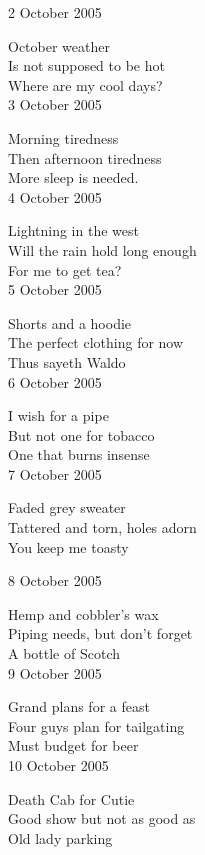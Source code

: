 \documentclass[12pt]{article}
\begin{document}
\newpage

2 October 2005

October weather \\
Is not supposed to be hot \\
Where are my cool days? \\

3 October 2005

Morning tiredness \\
Then afternoon tiredness \\
More sleep is needed. \\

4 October 2005

Lightning in the west \\
Will the rain hold long enough \\
For me to get tea? \\

5 October 2005

Shorts and a hoodie \\
The perfect clothing for now \\
Thus sayeth Waldo \\

6 October 2005

I wish for a pipe \\
But not one for tobacco \\
One that burns insense  \\


7 October 2005

Faded grey sweater \\
Tattered and torn, holes adorn \\
You keep me toasty \\

\newpage

8 October 2005

Hemp and cobbler's wax \\
Piping needs, but don't forget \\
A bottle of Scotch \\

9 October 2005

Grand plans for a feast \\
Four guys plan for tailgating \\
Must budget for beer \\

10 October 2005

Death Cab for Cutie \\
Good show but not as good as \\
Old lady parking \\
\end{document}
